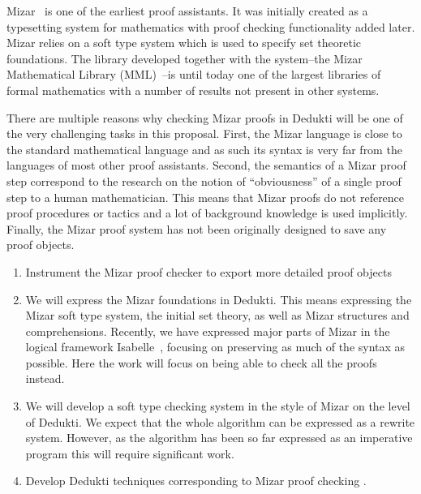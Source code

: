 
Mizar~\cite{bancerek:mizar2015} is one of the earliest proof assistants. 
It was initially created as a typesetting system for mathematics with proof
checking functionality added later. Mizar relies on a soft type system which
is used to specify set theoretic foundations. The library developed together
with the system--the Mizar Mathematical Library (MML)~\cite{bancerek:mml2017}--is
until today one of the largest libraries of formal mathematics with a number
of results not present in other systems.

There are multiple reasons why checking Mizar proofs in Dedukti will be one of
the very challenging tasks in this proposal. First, the Mizar language is close
to the standard mathematical language and as such its syntax is very far from
the languages of most other proof assistants. Second, the semantics of a Mizar
proof step correspond to the research on the notion of ``obviousness'' of a single
proof step to a human mathematician. This means that Mizar proofs do not
reference proof procedures or tactics and a lot of background knowledge is used
implicitly. Finally, the Mizar proof system has not been originally designed to save
any proof objects.

\begin{enumerate}
\item Instrument the Mizar proof checker to export more detailed proof objects 

\item We will express the Mizar foundations in Dedukti. This means expressing the
  Mizar soft type system, the initial set theory, as well as Mizar structures and
  comprehensions. Recently, we have expressed major parts of Mizar in the logical
  framework Isabelle~\cite{ckkp:isabellemizar2019}, focusing on preserving as much
  of the syntax as possible. Here the work will focus on being able to check all
  the proofs instead. 

\item We will develop a soft type checking system in the style of Mizar on the level
  of Dedukti. We expect that the whole algorithm can be expressed as a rewrite system.
  However, as the algorithm has been so far expressed as an imperative program this will
  require significant work.

\item Develop Dedukti techniques corresponding to Mizar proof checking .
\end{enumerate}


